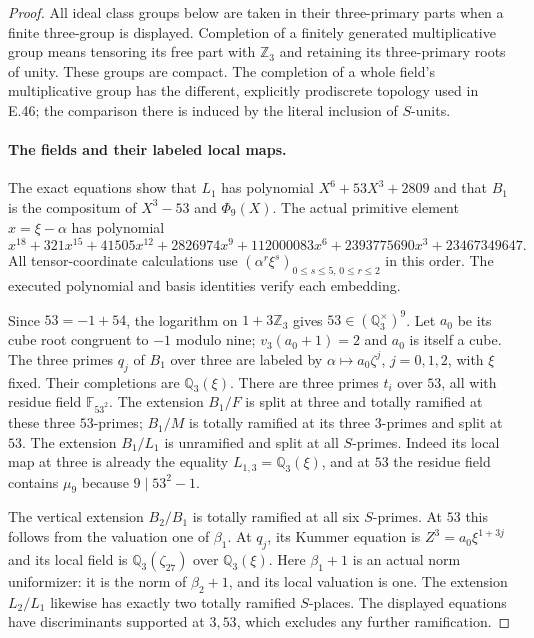 \begin{proof}
All ideal class groups below are taken in their three-primary parts
when a finite three-group is displayed. Completion of a finitely
generated multiplicative group means tensoring its free part with
$\mathbb Z_3$ and retaining its three-primary roots of unity. These
groups are compact. The completion of a whole field's multiplicative
group has the different, explicitly prodiscrete topology used in E.46;
the comparison there is induced by the literal inclusion of $S$-units.

\paragraph{The fields and their labeled local maps.}
The exact equations show that $L_1$ has polynomial
$X^6+53X^3+2809$ and that $B_1$ is the compositum of
$X^3-53$ and $\Phi_9(X)$. The actual primitive element
$x=\xi-\alpha$ has polynomial
\[
 x^{18}+321x^{15}+41505x^{12}+2826974x^9
 +112000083x^6+2393775690x^3+23467349647.
 \tag{E119.8}
\]
All tensor-coordinate calculations use
$(\alpha^r\xi^s)_{0\leq s\leq5,\,0\leq r\leq2}$ in this order.
The executed polynomial and basis identities verify each embedding.

Since $53=-1+54$, the logarithm on $1+3\mathbb Z_3$ gives
$53\in(\mathbb Q_3^\times)^9$. Let $a_0$ be its cube root
congruent to $-1$ modulo nine; $v_3(a_0+1)=2$ and $a_0$ is
itself a cube. The three primes $q_j$ of $B_1$ over three
are labeled by
$\alpha\mapsto a_0\zeta^j$, $j=0,1,2$, with $\xi$ fixed.
Their completions are $\mathbb Q_3(\xi)$.
There are three primes $t_i$ over $53$, all with residue field
$\mathbb F_{53^2}$. The extension $B_1/F$ is split at three
and totally ramified at these three $53$-primes; $B_1/M$ is
totally ramified at its three $3$-primes and split at $53$.
The extension $B_1/L_1$ is unramified and split at all $S$-primes.
Indeed its local map at three is already the equality
$L_{1,3}=\mathbb Q_3(\xi)$, and at $53$ the residue field
contains $\mu_9$ because $9\mid53^2-1$.

The vertical extension $B_2/B_1$ is totally ramified at all
six $S$-primes. At $53$ this follows from the valuation one
of $\beta_1$. At $q_j$, its Kummer equation is
$Z^3=a_0\xi^{1+3j}$ and its local field is
$\mathbb Q_3(\zeta_{27})$ over $\mathbb Q_3(\xi)$.
Here $\beta_1+1$ is an actual norm uniformizer: it is the
norm of $\beta_2+1$, and its local valuation is one.
The extension $L_2/L_1$ likewise has exactly two totally ramified
$S$-places. The displayed equations have discriminants supported
at $3,53$, which excludes any further ramification.


\end{proof}
